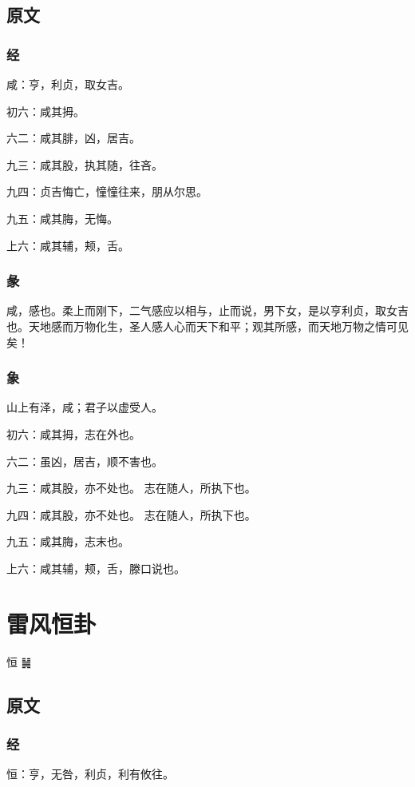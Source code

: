 \documentclass[12pt,oneside]{book}
\begin{document}
\section{原文}

\subsection{经}
咸：亨，利贞，取女吉。

初六：咸其拇。

六二：咸其腓，凶，居吉。

九三：咸其股，执其随，往吝。

九四：贞吉悔亡，憧憧往来，朋从尔思。

九五：咸其脢，无悔。

上六：咸其辅，颊，舌。

\subsection{彖}
咸，感也。柔上而刚下，二气感应以相与，止而说，男下女，是以亨利贞，取女吉也。天地感而万物化生，圣人感人心而天下和平；观其所感，而天地万物之情可见矣！

\subsection{象}
山上有泽，咸；君子以虚受人。

初六：咸其拇，志在外也。

六二：虽凶，居吉，顺不害也。

九三：咸其股，亦不处也。 志在随人，所执下也。

九四：咸其股，亦不处也。 志在随人，所执下也。

九五：咸其脢，志末也。

上六：咸其辅，颊，舌，滕口说也。

\chapter{雷风恒卦}
恒 {\Large ䷟}

\section{原文}

\subsection{经}
恒：亨，无咎，利贞，利有攸往。
\end{document}
